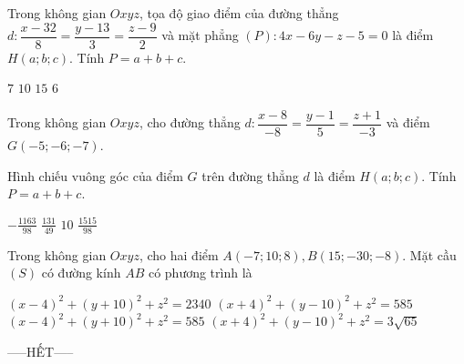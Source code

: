 \documentclass[12pt,a4paper]{article}
\begin{document}
\begin{ex}
 Trong không gian ${Oxyz}$, tọa độ giao điểm của đường thẳng ${d}:\dfrac{x - 32}{8}=\dfrac{y - 13}{3}=\dfrac{z - 9}{2}$ và mặt phẳng $(P):4 x - 6 y - z - 5=0$ là điểm $H(a;b;c)$. Tính $P=a+b+c$.
 
\choice
{ ${7}$ }
   { ${10}$ }
     { \True ${15}$ }
    { ${6}$ }
\end{ex}

\begin{ex}
 Trong không gian ${Oxyz}$, cho đường thẳng ${d}:\dfrac{x - 8}{-8}=\dfrac{y - 1}{5}=\dfrac{z + 1}{-3}$ và điểm $G(-5;-6;-7)$.

 Hình chiếu vuông góc của điểm $G$ trên đường thẳng ${d}$ là điểm $H(a;b;c)$. Tính $P=a+b+c$.
 
\choice
{ ${- \frac{1163}{98}}$ }
   { \True ${\frac{131}{49}}$ }
     { ${10}$ }
    { ${\frac{1515}{98}}$ }
\end{ex}

\begin{ex}
 Trong không gian ${Oxyz}$, cho hai điểm $A(-7;10;8),B(15;-30;-8)$. Mặt cầu ${(S)}$ có đường kính ${AB}$ có phương trình là
 
\choice
{ $\left(x - 4\right)^{2}+\left(y + 10\right)^{2}+z^{2}=2340$ }
   { $\left(x + 4\right)^{2}+\left(y - 10\right)^{2}+z^{2}=585$ }
     { \True $\left(x - 4\right)^{2}+\left(y + 10\right)^{2}+z^{2}=585$ }
    { $\left(x + 4\right)^{2}+\left(y - 10\right)^{2}+z^{2}=3 \sqrt{65}$ }
\end{ex}


 \begin{center}
-----HẾT-----
\end{center}

\end{document}
